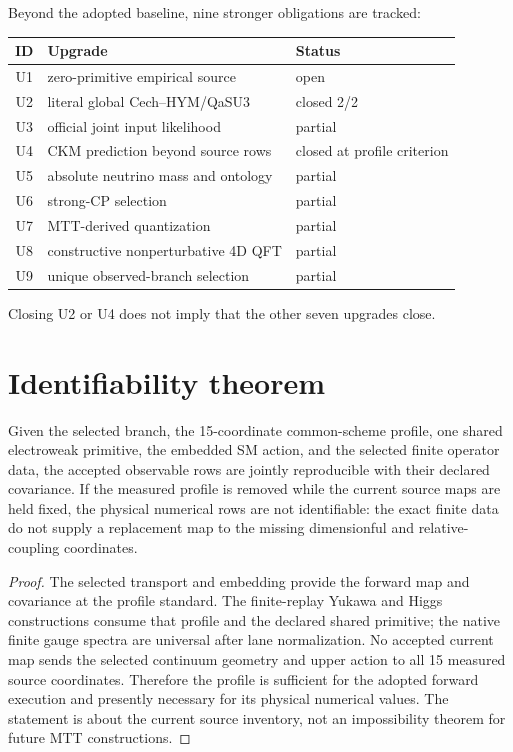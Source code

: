 \documentclass[11pt]{article}
\begin{document}
Beyond the adopted baseline, nine stronger obligations are tracked:
\begin{center}
\begin{tabular}{cll}
\toprule
ID & Upgrade & Status \\
\midrule
U1 & zero-primitive empirical source & open \\
U2 & literal global Cech--HYM/QaSU3 & closed 2/2 \\
U3 & official joint input likelihood & partial \\
U4 & CKM prediction beyond source rows & closed at profile criterion \\
U5 & absolute neutrino mass and ontology & partial \\
U6 & strong-CP selection & partial \\
U7 & MTT-derived quantization & partial \\
U8 & constructive nonperturbative 4D QFT & partial \\
U9 & unique observed-branch selection & partial \\
\bottomrule
\end{tabular}
\end{center}
Closing U2 or U4 does not imply that the other seven upgrades close.

\section{Identifiability theorem}

\begin{theorem}
Given the selected branch, the 15-coordinate common-scheme profile, one shared
electroweak primitive, the embedded SM action, and the selected finite operator
data, the accepted observable rows are jointly reproducible with their
declared covariance. If the measured profile is removed while the current
source maps are held fixed, the physical numerical rows are not identifiable:
the exact finite data do not supply a replacement map to the missing
dimensionful and relative-coupling coordinates.
\end{theorem}

\begin{proof}
The selected transport and embedding provide the forward map and covariance at
the profile standard. The finite-replay Yukawa and Higgs constructions consume
that profile and the declared shared primitive; the native finite gauge
spectra are universal after lane normalization. No accepted current map sends
the selected continuum geometry and upper action to all 15 measured source
coordinates. Therefore the profile is sufficient for the adopted forward
execution and presently necessary for its physical numerical values. The
statement is about the current source inventory, not an impossibility theorem
for future MTT constructions.
\end{proof}
\end{document}
